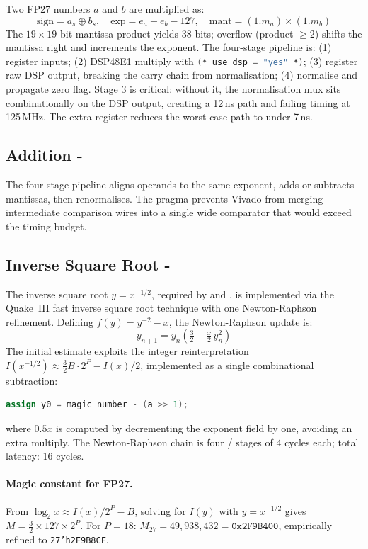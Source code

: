 Two FP27 numbers $a$ and $b$ are multiplied as:
\[
    \text{sign} = a_s \oplus b_s, \quad
    \text{exp} = e_a + e_b - 127, \quad
    \text{mant} = (1.m_a) \times (1.m_b)
\]
The $19\times19$-bit mantissa product yields 38 bits; overflow (product $\geq
2$) shifts the mantissa right and increments the exponent. The four-stage
pipeline is: (1) register inputs; (2) DSP48E1 multiply with
\lstinline[language=Verilog]{(* use_dsp = "yes" *)}; (3) register raw DSP
output, breaking the carry chain from normalisation; (4) normalise and
propagate zero flag. Stage 3 is critical: without it, the normalisation mux
sits combinationally on the DSP output, creating a 12\,ns path and failing
timing at 125\,MHz. The extra register reduces the worst-case path to under
7\,ns.

\subsection{Addition - }

The four-stage pipeline aligns operands to the same exponent, adds or subtracts
mantissas, then renormalises. The  pragma prevents
Vivado from merging intermediate comparison wires into a single wide comparator
that would exceed the timing budget.

\subsection{Inverse Square Root - }
\label{sec:isqrt}

The inverse square root $y = x^{-1/2}$, required by  and
, is implemented via the Quake~III fast inverse square root
technique with one Newton-Raphson refinement. Defining $f(y) = y^{-2} - x$,
the Newton-Raphson update is:
\[
    y_{n+1} = y_n\!\left(\tfrac{3}{2} - \tfrac{x}{2}\,y_n^2\right)
\]
The initial estimate exploits the integer reinterpretation $I(x^{-1/2}) \approx
\frac{3}{2}B\cdot2^P - I(x)/2$, implemented as a single combinational
subtraction:
\begin{lstlisting}[language=Verilog]
assign y0 = magic_number - (a >> 1);
\end{lstlisting}
where $0.5x$ is computed by decrementing the exponent field by one, avoiding
an extra multiply. The Newton-Raphson chain is four /
stages of 4 cycles each; total latency: 16 cycles.

\paragraph{Magic constant for FP27.}
From $\log_2 x \approx I(x)/2^P - B$, solving for $I(y)$ with $y = x^{-1/2}$
gives $M = \frac{3}{2}\times127\times2^P$. For $P=18$: $M_{27} =
49{,}938{,}432 = \texttt{0x2F9B400}$, empirically refined to
\texttt{27'h2F9B8CF}.

